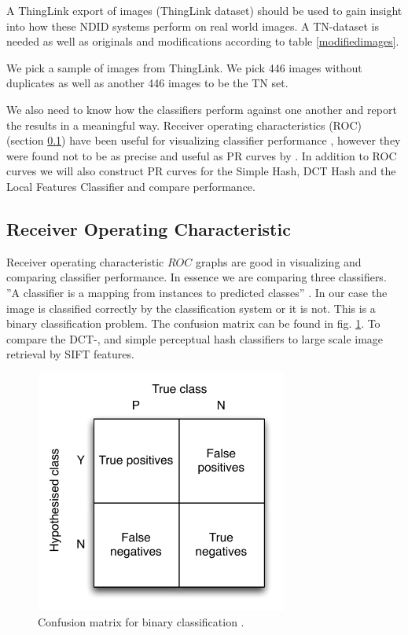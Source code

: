\documentclass[english,12pt,a4paper,pdftex,elec,utf8]{aaltothesis}
\begin{document}
A ThingLink export of images (ThingLink dataset) should be used to gain insight into how these NDID systems perform on real world images. A TN-dataset is needed as well as originals and modifications according to table \ref{modifiedimages}.

We pick a sample of images from ThingLink. We pick 446 images without duplicates as well as another 446 images to be the TN set.

We also need to know how the classifiers perform against one another and report the results in a meaningful way. Receiver operating characteristics (ROC) (section \ref{ROCSection}) have been useful for visualizing classifier performance \cite{Fawcett2006}, however they were found not to be as precise and useful as PR curves by \cite{Davis2006}. In addition to ROC curves we will also construct PR curves for the Simple Hash, DCT Hash and the Local Features Classifier and compare performance.

\subsection{Receiver Operating Characteristic}\label{ROCSection}
Receiver operating characteristic \(ROC\) graphs are good in visualizing and comparing classifier performance. In essence we are comparing three classifiers. ''A classifier is a mapping from instances to predicted classes'' \cite{Fawcett2006}. In our case the image is classified correctly by the classification system or it is not. This is a binary classification problem. The confusion matrix can be found in fig. \ref{figconfusion}. To compare the DCT-, and simple perceptual hash classifiers to large scale image retrieval by SIFT features.

\begin{figure}[htb]
\begin{center}
\includegraphics[height=8cm]{figures/confusion}
\end{center}
\caption{Confusion matrix for binary classification \cite{Fawcett2006}. }
\label{figconfusion}
\end{figure}
\end{document}
